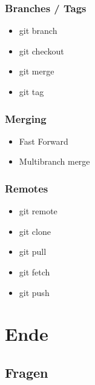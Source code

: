 \documentclass{beamer}
\begin{document}
			\begin{frame}
				\frametitle{Branches / Tags}

				\begin{itemize}
					\item{git branch}
					\item{git checkout}
					\item{git merge}
					\item{git tag}
				\end{itemize}
			\end{frame}

			\begin{frame}
				\frametitle{Merging}

				\begin{itemize}
					\item{Fast Forward}
					\item{Multibranch merge}
				\end{itemize}
			\end{frame}

			\begin{frame}
				\frametitle{Remotes}

				\begin{itemize}
					\item{git remote}
					\item{git clone}
					\item{git pull}
					\item{git fetch}
					\item{git push}
				\end{itemize}
			\end{frame}

	\section{Ende}
		\subsection{Fragen}
\end{document}
